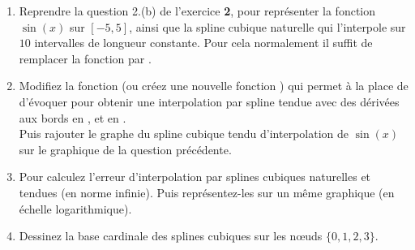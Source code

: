 \documentclass[a4paper,12pt,reqno]{amsart}
\begin{document}
\begin{exo}
\begin{enumerate}
     \item Reprendre la question 2.(b) de l'exercice \textbf{2}, pour représenter la fonction $\sin(x)$ sur $[-5,5]$, ainsi que la spline cubique naturelle qui l'interpole sur $10$ intervalles de longueur constante. Pour cela normalement il suffit de remplacer la fonction  par .

     \item Modifiez la fonction  (ou créez une nouvelle fonction ) qui permet à la place de  d'évoquer  pour obtenir une interpolation par spline tendue avec des dérivées aux bords  en , et  en .\\
     Puis rajouter le graphe du spline cubique tendu d'interpolation de $\sin(x)$ sur le graphique de la question précédente.

     \item Pour  calculez l'erreur d'interpolation par splines cubiques naturelles et tendues (en norme infinie). Puis représentez-les sur un même graphique (en échelle logarithmique).

     \item Dessinez la base cardinale des splines cubiques sur les nœuds $\{0,1,2,3\}$.

  \end{enumerate}
\end{exo}

\end{document}

